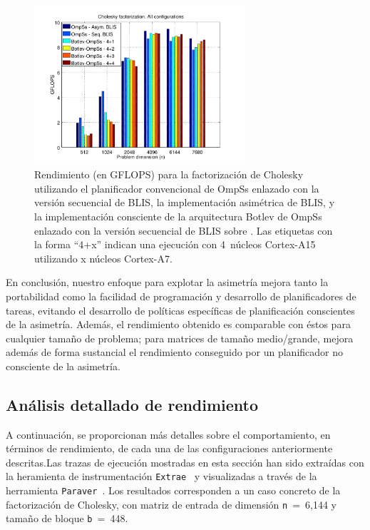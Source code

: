 \begin{figure}
\centering
\includegraphics[width=0.70\textwidth]{Plots/Comparative/comparative}
\caption{Rendimiento (en GFLOPS) para la factorización de Cholesky utilizando 
el planificador convencional de OmpSs enlazado con la versión secuencial de BLIS, la implementación asimétrica de BLIS, y 
la implementación consciente de la arquitectura Botlev de OmpSs enlazado con la versión secuencial de BLIS sobre \odroid. 
Las etiquetas con la forma ``4+x'' indican una ejecución con 4~núcleos Cortex-A15 utilizando x núcleos Cortex-A7.}
\label{fig:comparative}
\end{figure}

En conclusión, nuestro enfoque para explotar la asimetría mejora tanto la portabilidad como la facilidad de
programación y desarrollo de planificadores de tareas, evitando el desarrollo de políticas específicas de planificación
conscientes de la asimetría. Además, el rendimiento obtenido es comparable con éstos para cualquier tamaño de problema; para
matrices de tamaño medio/grande, mejora además de forma sustancial el rendimiento conseguido por un planificador no consciente de la
asimetría.

\subsection{Análisis detallado de rendimiento}

A continuación, se proporcionan más detalles sobre el comportamiento, en términos de rendimiento, de cada una de las 
configuraciones anteriormente descritas.Las trazas de ejecución mostradas en esta sección han sido extraídas con la
heramienta de instrumentación {\tt Extrae}~\cite{Extrae} y visualizadas a través de la herramienta {\tt Paraver}~\cite{Paraver}.
Los resultados corresponden a un caso concreto de la factorización de Cholesky, con matriz de entrada de dimensión
{\tt n}~=~6,144 y tamaño de bloque {\tt b}~=~448.

